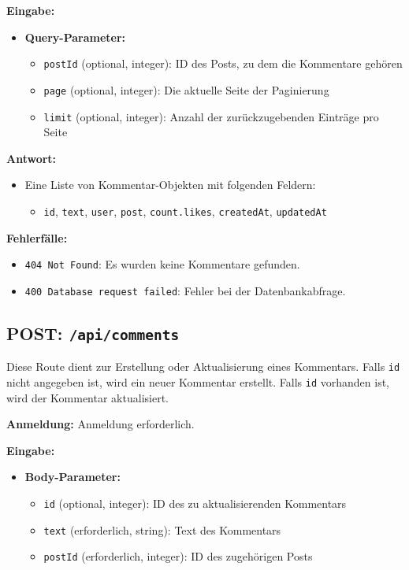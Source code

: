 \documentclass[a4paper,12pt]{article}
\begin{document}
\textbf{Eingabe:}
\begin{itemize}
    \item \textbf{Query-Parameter:}
    \begin{itemize}
        \item \texttt{postId} (optional, integer):
            ID des Posts, zu dem die Kommentare gehören
        \item \texttt{page} (optional, integer):
            Die aktuelle Seite der Paginierung
        \item \texttt{limit} (optional, integer):
            Anzahl der zurückzugebenden Einträge pro Seite
    \end{itemize}
\end{itemize}

\textbf{Antwort:}
\begin{itemize}
    \item Eine Liste von Kommentar-Objekten mit folgenden Feldern:
    \begin{itemize}
        \item \texttt{id},
              \texttt{text},
              \texttt{user},
              \texttt{post},
              \texttt{count.likes},
              \texttt{createdAt},
              \texttt{updatedAt}
    \end{itemize}
\end{itemize}

\textbf{Fehlerfälle:}
\begin{itemize}
    \item \texttt{404 Not Found}:
        Es wurden keine Kommentare gefunden.
    \item \texttt{400 Database request failed}:
        Fehler bei der Datenbankabfrage.
\end{itemize}

\newpage
\subsection{POST: \texttt{/api/comments}}

Diese Route dient zur Erstellung oder Aktualisierung eines Kommentars. Falls
\texttt{id} nicht angegeben ist, wird ein neuer Kommentar erstellt. Falls
\texttt{id} vorhanden ist, wird der Kommentar aktualisiert.

\textbf{Anmeldung:} Anmeldung erforderlich.

\textbf{Eingabe:}
\begin{itemize}
    \item \textbf{Body-Parameter:}
    \begin{itemize}
        \item \texttt{id} (optional, integer):
            ID des zu aktualisierenden Kommentars
        \item \texttt{text} (erforderlich, string):
            Text des Kommentars
        \item \texttt{postId} (erforderlich, integer):
            ID des zugehörigen Posts
    \end{itemize}
\end{itemize}
\end{document}

